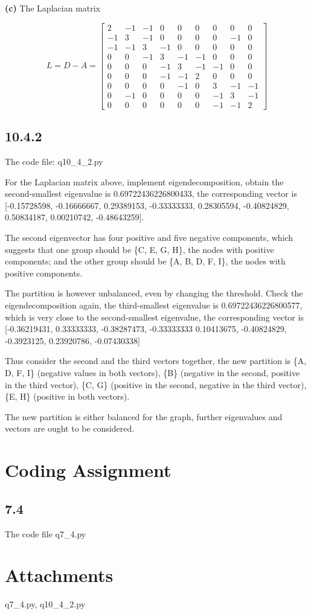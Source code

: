 \documentclass[a4paper, 11pt]{article}
\begin{document}
\textbf{(c)} The Laplacian matrix

$$L = D - A = \begin{bmatrix}
2 &  -1 & -1 & 0 & 0 & 0 & 0 & 0 & 0 \\
-1 & 3 & -1 & 0 & 0 & 0 & 0 & -1 & 0 \\
-1 & -1 & 3 & -1 & 0 & 0 & 0 & 0 & 0 \\
0 & 0 & -1 & 3 & -1 & -1 & 0 & 0 & 0 \\
0 & 0 & 0 & -1 & 3 & -1 & -1 & 0 & 0 \\
0 & 0 & 0 & -1 & -1 & 2 & 0 & 0 & 0 \\
0 & 0 & 0 & 0 & -1 & 0 & 3 & -1 & -1 \\
0 & -1 & 0 & 0 & 0 & 0 & -1 & 3 & -1 \\
0 & 0 & 0 & 0 & 0 & 0 & -1 & -1 & 2
\end{bmatrix}$$


\subsection*{10.4.2} 

The code file: q10\_4\_2.py

For the Laplacian matrix above, implement eigendecomposition, obtain the second-smallest eigenvalue is  0.69722436226800433, the corresponding vector is  [-0.15728598, -0.16666667, 0.29389153, -0.33333333, 0.28305594, -0.40824829,  0.50834187,  0.00210742, -0.48643259].

The second eigenvector has four positive and five negative components, which suggests that one group should be \{C, E, G, H\}, the nodes with positive components; and the other group should be \{A, B, D, F, I\}, the nodes with positive components. 

The partition is however unbalanced, even by changing the threshold. Check the eigendecomposition again, the third-smallest eigenvalue is 0.69722436226800577, which is very close to the second-smallest eigenvalue, the corresponding vector is [-0.36219431,  0.33333333, -0.38287473, -0.33333333  0.10413675, -0.40824829, -0.3923125,  0.23920786, -0.07430338]

Thus consider the second and the third vectors together, the new partition is \{A, D, F, I\} (negative values in both vectors), \{B\} (negative in the second, positive in the third vector), \{C, G\} (positive in the second, negative in the third vector), \{E, H\} (positive in both vectors).

The new partition is either balanced for the graph, further eigenvalues and vectors are ought to be considered.
  
\section*{Coding Assignment}

\subsection*{7.4}

The code file q7\_4.py

\section*{Attachments}

q7\_4.py, q10\_4\_2.py
\end{document}
